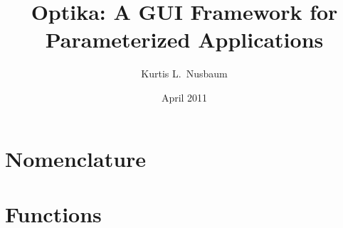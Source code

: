 \documentclass[10pt]{article}
\title{Optika: A GUI Framework for Parameterized Applications}
\date{April 2011}
\author{Kurtis L.\ Nusbaum}
\begin{document}


\maketitle

\begin{abstract}

\end{abstract}
\pagebreak
\tableofcontents
\pagebreak


\appendix
\section{Nomenclature}

\section{Functions}
\label{sec:funcs}



\end{document}
